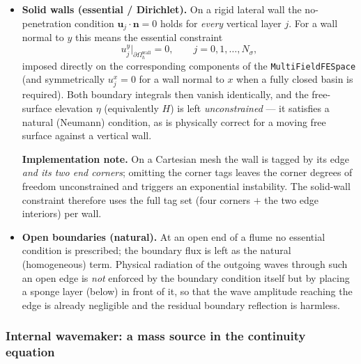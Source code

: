 \documentclass{article}
\newcommand{\Ns}{N_\sigma}
\newcommand{\uj}{\mathbf{u}_j}
\newcommand{\Oh}{\Omega_h}
\begin{document}
\begin{itemize}
    \item \textbf{Solid walls (essential / Dirichlet).} On a rigid lateral wall the no-penetration
    condition $\uj\cdot\mathbf{n}=0$ holds for \emph{every} vertical layer $j$. For a wall normal to
    $y$ this means the essential constraint
    \begin{equation*}
        u_j^y\big|_{\partial\Oh^{\text{wall}}} = 0, \qquad j = 0,1,\dots,\Ns,
    \end{equation*}
    imposed directly on the corresponding components of the \texttt{MultiFieldFESpace} (and
    symmetrically $u_j^x=0$ for a wall normal to $x$ when a fully closed basin is required). Both
    boundary integrals then vanish identically, and the free-surface elevation $\eta$ (equivalently
    $H$) is left \emph{unconstrained} --- it satisfies a natural (Neumann) condition, as is physically
    correct for a moving free surface against a vertical wall.

    \textbf{Implementation note.} On a Cartesian mesh the wall is tagged by its edge \emph{and its two
    end corners}; omitting the corner tags leaves the corner degrees of freedom unconstrained and
    triggers an exponential instability. The solid-wall constraint therefore uses the full tag set
    (four corners $+$ the two edge interiors) per wall.

    \item \textbf{Open boundaries (natural).} At an open end of a flume no essential condition is
    prescribed; the boundary flux is left as the natural (homogeneous) term. Physical radiation of
    the outgoing waves through such an open edge is \emph{not} enforced by the boundary condition
    itself but by placing a sponge layer (below) in front of it, so that the wave amplitude reaching
    the edge is already negligible and the residual boundary reflection is harmless.
\end{itemize}

\subsubsection*{Internal wavemaker: a mass source in the continuity equation}
\end{document}
